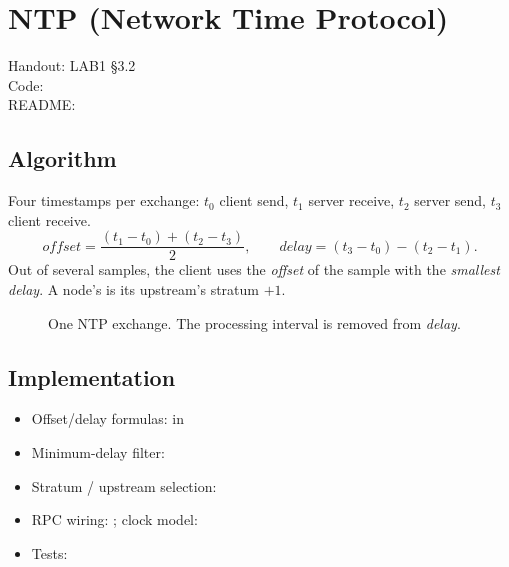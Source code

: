\section{NTP (Network Time Protocol)}\label{sec:ntp}
Handout: LAB1 §3.2 \\
Code:  \\
README: 

\subsection{Algorithm}
Four timestamps per exchange: $t_0$ client send, $t_1$ server receive, $t_2$ server
send, $t_3$ client receive.
\[
  \mathit{offset} = \frac{(t_1 - t_0) + (t_2 - t_3)}{2}, \qquad
  \mathit{delay}  = (t_3 - t_0) - (t_2 - t_1).
\]
Out of several samples, the client uses the \emph{offset} of the sample with the
\emph{smallest delay}. A node's  is its upstream's stratum $+1$.

\begin{figure}[H]\centering
{}
\caption{One NTP exchange. The processing interval is removed from \emph{delay}.}
\end{figure}


\subsection{Implementation}
\begin{itemize}[itemsep=2pt]
  \item Offset/delay formulas:  in 
  \item Minimum-delay filter: 
  \item Stratum / upstream selection: 
  \item RPC wiring: ; clock model: 
  \item Tests: 
\end{itemize}

